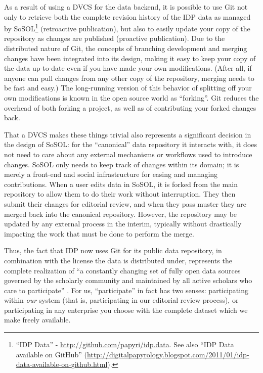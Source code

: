 \documentclass[]{article}
\begin{document}
As a result of using a DVCS for the data backend, it is possible to use Git not only to retrieve both the complete revision history of the IDP data as managed by SoSOL\footnote{“IDP Data” - \url{http://github.com/papyri/idp.data}. See also “IDP Data available on GitHub”  (\url{http://digitalpapyrology.blogspot.com/2011/01/idp-data-available-on-github.html}).} (retroactive publication), but also to easily update your copy of the repository as changes are published (proactive publication). Due to the distributed nature of Git, the concepts of branching development and merging changes have been integrated into its design, making it easy to keep your copy of the data up-to-date even if you have made your own modifications. (After all, if anyone can pull changes from any other copy of the repository, merging needs to be fast and easy.) The long-running version of this behavior of splitting off your own modifications is known in the open source world as “forking”. Git reduces the overhead of both forking a project, as well as of contributing your forked changes back.

That a DVCS makes these things trivial also represents a significant decision in the design of SoSOL: for the “canonical” data repository it interacts with, it does not need to care about any external mechanisms or workflows used to introduce changes. SoSOL only needs to keep track of changes within its domain; it is merely a front-end and social infrastructure for easing and managing contributions. When a user edits data in SoSOL, it is forked from the main repository to allow them to do their work without interruption. They then submit their changes for editorial review, and when they pass muster they are merged back into the canonical repository. However, the repository may be updated by any external process in the interim, typically without drastically impacting the work that must be done to perform the merge.

Thus, the fact that IDP now uses Git for its public data repository, in combination with the license the data is distributed under, represents the complete realization of “a constantly changing set of fully open data sources governed by the scholarly community and maintained by all active scholars who care to participate” \citep{bagnall}. For us, “participate” in fact has two senses: participating within \emph{our} system (that is, participating in our editorial review process), or participating in any enterprise you choose with the complete dataset which we make freely available.
\end{document}

